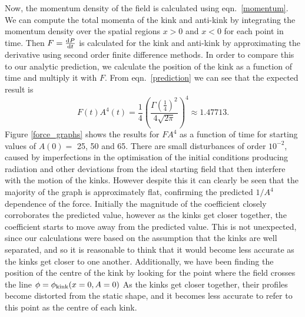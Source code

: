 \documentclass[11pt, oneside,titlepage]{article}  	%
\numberwithin{equation}{section}
\newcommand{\drv}{\ensuremath{\textup{d}}}
\begin{document}
Now, the momentum density of the field is calculated using eqn.~\ref{momentum}. We can compute the total momenta of the kink and anti-kink by integrating the momentum density over the spatial regions $x>0$ and $x<0$ for each point in time. Then $F = \frac{\drv P}{\drv t}$ is calculated for the kink and anti-kink by approximating the derivative using second order finite difference methods. In order to compare this to our analytic prediction, we calculate the position of the kink as a function of time and multiply it with $F$. From eqn.~\ref{prediction} we can see that the expected result is
\begin{equation}
F(t) A^4(t) =\frac{1}{4} \left (\frac{ \Gamma\left(\frac{1}{4}\right)^2}{4\sqrt{2\pi} }\right )^4 \approx 1.47713.
\end{equation}
Figure \ref{force_graphs} shows the results for $FA^4$ as a function of time for starting values of $A(0) = $ 25, 50 and 65. There are small disturbances of order $10^{-2}$, caused by imperfections in the optimisation of the initial conditions producing radiation and other deviations from the ideal starting field that then interfere with the motion of the kinks. However despite this it can clearly be seen that the majority of the graph is approximately flat, confirming the predicted $1/A^4$ dependence of the force. Initially the magnitude of the coefficient closely corroborates the predicted value, however as the kinks get closer together, the coefficient starts to move away from the predicted value. This is not unexpected, since our calculations were based on the assumption that the kinks are well separated, and so it is reasonable to think that it would become less accurate as the kinks get closer to one another. Additionally, we have been finding the position of the centre of the kink by looking for the point where the field crosses the line $\phi = \phi_{\textup{kink}}(x=0,A=0)$ As the kinks get closer together, their profiles become distorted from the static shape, and it becomes less accurate to refer to this point as the centre of each kink.
\end{document}
